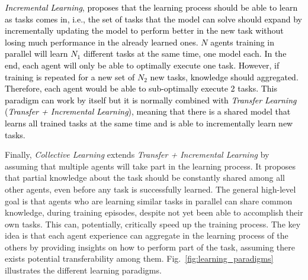 \textcolor{black}{\textit{Incremental Learning}, proposes that the learning process should be able to learn as tasks comes in, i.e., the set of tasks that the model can solve should expand by incrementally updating the model to perform better in the new task without losing much performance in the already learned ones. $N$ agents training in parallel will learn $N_1$ different tasks at the same time, one model each. In the end, each agent will only be able to optimally execute one task. However, if training is repeated for a new set of $N_2$ new tasks, knowledge should aggregated. Therefore, each agent would be able to sub-optimally execute 2 tasks. This paradigm can work by itself but it is normally combined with \textit{Transfer Learning} (\textit{Transfer + Incremental Learning}), meaning that there is a shared model that learns all trained tasks at the same time and is able to incrementally learn new tasks.} %




Finally, \textit{Collective Learning} extends \textit{Transfer + Incremental Learning} by assuming that multiple agents will take part in the learning process. It proposes that partial knowledge about the task should be constantly shared among all other agents, even before any task is successfully learned. %
The general high-level goal is that agents who are learning similar tasks in parallel can share common knowledge, during training episodes, despite not yet been able to accomplish their own tasks. This can, potentially, critically speed up the training process. The key idea is that each agent experience can aggregate in the learning process of the others by providing insights on how to perform part of the task, assuming there exists potential transferability among them. Fig.~\ref{fig:learning_paradigms} illustrates the different learning paradigms.

